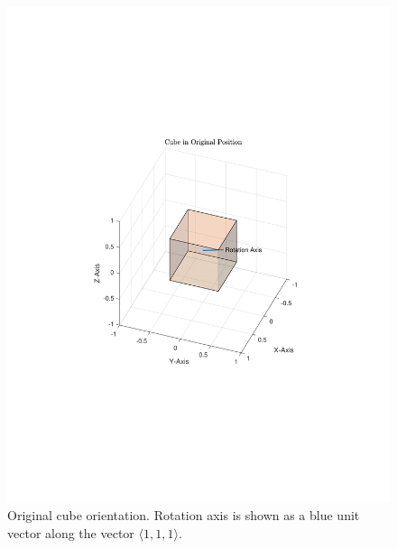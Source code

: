 \documentclass[10pt, letterpaper]{article}
\newcommand\docstretch{1.2}
\begin{document}

\setstretch{\docstretch}

\begin{figure}[H]
	\centering
	\includegraphics[scale=0.8]{Quaternion_OriginalCube.pdf}
    \caption{Original cube orientation. Rotation axis is shown as a blue unit vector along the vector $\langle 1, 1, 1 \rangle$.}
    \label{fig:Quaternion_OriginalCube}
\end{figure}
\end{document}
